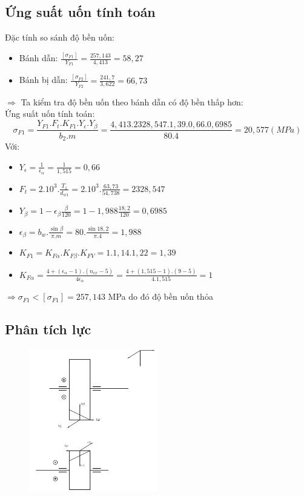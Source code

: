 \subsection{Ứng suất uốn tính toán}
Đặc tính so sánh độ bền uốn:
\begin{itemize}
    \item Bánh dẫn: $\frac{[\sigma_{F1}]}{Y_{F1}} = \frac{257,143}{4,413} = 58,27$
    \item Bánh bị dẫn: $\frac{[\sigma_{F2}]}{Y_{F2}} = \frac{241,7}{3,622} = 66,73$
\end{itemize}
$\Rightarrow$ Ta kiểm tra độ bền uốn theo bánh dẫn có độ bền thấp hơn:\\
Ứng suất uốn tính toán:
\[
    \sigma_{F1} = \frac{Y_{F1}.F_t.K_{F1}.Y_\epsilon.Y_\beta}{b_2.m} = \frac{4,413.2328,547.1,39.0,66.0,6985}{80.4} = 20,577 (MPa)
\] 
Với: 
\begin{itemize}
    \item $Y_\epsilon = \frac{1}{\epsilon_\alpha} = \frac{1}{1,515} = 0,66$
    \item $F_t = 2.10^3.\frac{T_1}{d_{w1}} = 2.10^3.\frac{63,73}{54,738} = 2328,547$
    \item $Y_\beta = 1 - \epsilon_\beta\frac{\beta}{120} = 1 - 1,988\frac{18,2}{120} = 0,6985$
    \item $\epsilon_\beta = b_w.\frac{\sin\beta}{\pi.m} = 80.\frac{\sin18,2}{\pi.4} = 1,988$
    \item $K_{F1} = K_{F\alpha}.K_{F\beta}.K_{FV} = 1.1,14.1,22 = 1,39$
    \item $K_{F\alpha} = \frac{4 + (\epsilon_\alpha - 1).(n_{cx} - 5)}{4\epsilon_\alpha} = \frac{4 + (1,515 - 1).(9 - 5)}{4.1,515} = 1$
\end{itemize}
$\Rightarrow \sigma_{F1} < [\sigma_{F1}] = 257,143$ MPa do đó độ bền uốn thỏa\\
\subsection{Phân tích lực}
\begin{figure}[H]
    \centering
    \includegraphics[width=0.5\textwidth]{pictures/phantichluc.png}
\end{figure}
\cleardoublepage